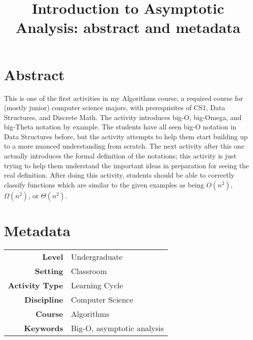 \documentclass{tufte-handout}
\title{Introduction to Asymptotic Analysis: abstract and metadata}
\begin{document}
\maketitle

\section{Abstract}

This is one of the first activities in my Algorithms course, a
required course for (mostly junior) computer science majors, with
prerequisites of CS1, Data Structures, and Discrete Math.  The
activity introduces big-O, big-Omega, and big-Theta notation by
example.  The students have all seen big-O notation in Data Structures
before, but the activity attempts to help them start building up to a
more nuanced understanding from scratch.  The next activity after this
one actually introduces the formal definition of the notations; this
activity is just trying to help them understand the important ideas in
preparation for seeing the real definition.  After doing this
activity, students should be able to correctly classify functions
which are similar to the given examples as being $O(n^2)$,
$\Omega(n^2)$, or $\Theta(n^2)$.

\section{Metadata}

\begin{tabular}{rl}
  \textbf{Level} & Undergraduate \\
  \textbf{Setting} & Classroom \\
  \textbf{Activity Type} & Learning Cycle \\
  \textbf{Discipline} & Computer Science \\
  \textbf{Course} & Algorithms \\
  \textbf{Keywords} & Big-O, asymptotic analysis
\end{tabular}
\end{document}
